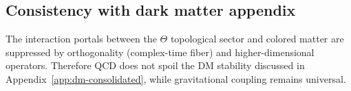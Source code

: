 \subsection{Consistency with dark matter appendix}
The interaction portals between the $\Theta$ topological sector and colored matter are suppressed by orthogonality (complex-time fiber)
and higher-dimensional operators. Therefore QCD does not spoil the DM stability discussed in Appendix~\ref{app:dm-consolidated}, while gravitational coupling remains universal.